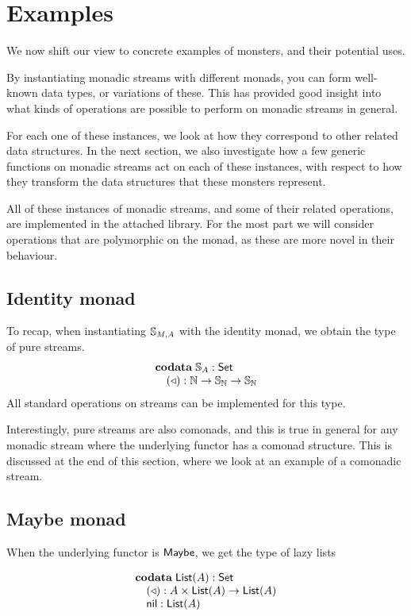 \section{Examples}

We now shift our view to concrete examples of monsters, and their potential uses.

By instantiating monadic streams with different monads, you can form well-known data types, or variations of these. This has provided good insight into what kinds of operations are possible to perform on monadic streams in general.

For each one of these instances, we look at how they correspond to other related data structures. In the next section, we also investigate how a few generic functions on monadic streams act on each of these instances, with respect to how they transform the data structures that these monsters represent.

All of these instances of monadic streams, and some of their related operations, are implemented in the attached library. For the most part we will consider operations that are polymorphic on the monad, as these are more novel in their behaviour.

\subsection{Identity monad}

To recap, when instantiating $\mathbb{S}_{M,A}$ with the identity monad, we obtain the type of pure streams.
$$
\begin{array}[t]{l}
\mathbf{codata}\;
\mathbb{S}_{A}:\mathsf{Set}\\
\quad (\triangleleft): \mathbb{N}\rightarrow \mathbb{S}_{\mathbb{N}} \rightarrow\mathbb{S}_{\mathbb{N}}
\end{array}
$$
All standard operations on streams can be implemented for this type.

Interestingly, pure streams are also comonads, and this is true in general for any monadic stream where the underlying functor has a comonad structure. This is discussed at the end of this section, where we look at an example of a comonadic stream.

\subsection{Maybe monad}

When the underlying functor is $\mathsf{Maybe}$, we get the type of lazy lists

$$
\begin{array}[t]{l}
\mathbf{codata}\;
\mathsf{List}(A):\mathsf{Set}\\
\quad (\triangleleft): A\times \mathsf{List}(A)\rightarrow\mathsf{List}(A)\\
\quad \mathsf{nil}: \mathsf{List}(A)
\end{array}
$$

